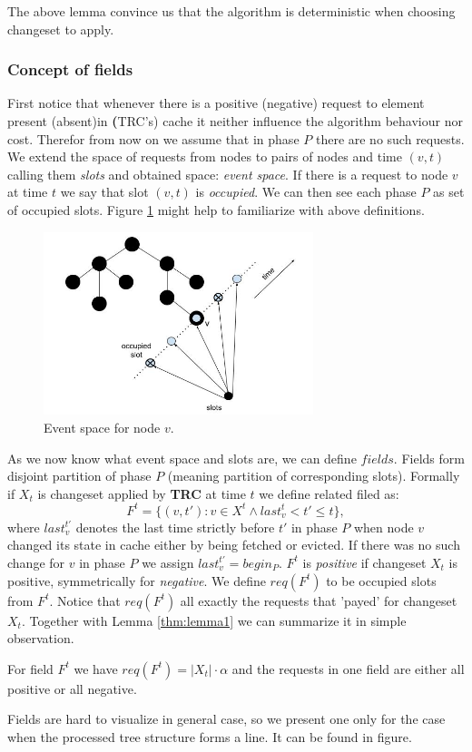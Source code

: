 The above lemma convince us that the algorithm is deterministic when choosing 
changeset to apply.

\subsubsection{Concept of fields}
First notice that whenever there is a positive (negative) request to element 
present (absent)in \textbf(TRC's) cache it neither influence the algorithm 
behaviour nor cost. Therefor from now on we assume that in phase $P$ there are 
no such requests.
We extend the space of requests from nodes to pairs of nodes and time $(v, t)$ 
calling them \textit{slots} and obtained space: \textit{event space}. If there 
is a request to node $v$ at time $t$ we say that slot $(v, t)$ is 
\textit{occupied}. We can then see each phase $P$ as set of occupied slots. 
Figure \ref{fig:spacial_temporal} might help to familiarize with above 
definitions.
\begin{figure}
 \begin{center}
  \includegraphics[width=0.7\textwidth]{spacial_temporal.jpg}
 \end{center}
 \caption{Event space for node $v$.}
 \label{fig:spacial_temporal}
\end{figure}

As we now know what event space and slots are, we can define $fields$. Fields 
form disjoint partition of phase $P$ (meaning partition of corresponding 
slots). Formally if $X_t$ is changeset applied by \textbf{TRC} at time $t$ we 
define related filed as:
$$ F^t = \{(v, t'): v \in X^t \wedge last_v^t < t' \leq t\},$$
where $last_v^{t'}$ denotes the last time strictly before $t'$ in phase $P$ 
when node $v$ changed its state in cache either by being fetched or evicted. If 
there was no such change for $v$ in phase $P$ we assign $last_v^{t'} = begin_P$.
$F^t$ is \textit{positive} if changeset $X_t$ is positive, symmetrically for 
\textit{negative}. We define $req(F^t)$ to be occupied slots from $F^t$. Notice 
that $req(F^t)$ all exactly the requests that 'payed' for changeset $X_t$. 
Together with Lemma \ref{thm:lemma1} we can summarize it in simple observation.
\begin{observe}
For field $F^t$ we have $req(F^t) = |X_t| \cdot \alpha$ and the requests 
in one field are either all positive or all negative.
\end{observe}
Fields are hard to visualize in general case, so we present one only for the 
case when the processed tree structure forms a line. It can be found in figure.
